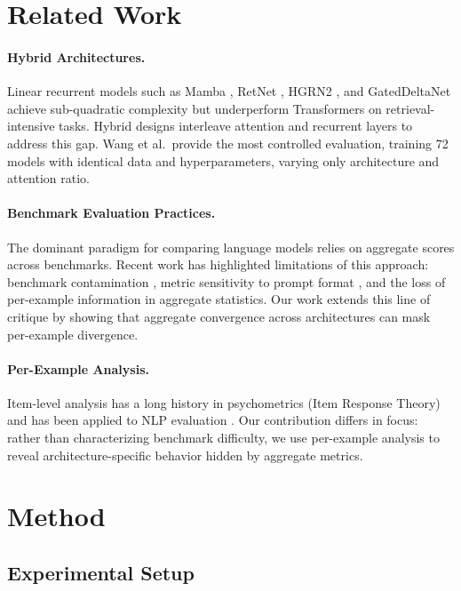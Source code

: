 \documentclass[11pt,a4paper]{article}
\begin{document}
\section{Related Work}
\label{sec:related}

\paragraph{Hybrid Architectures.}
Linear recurrent models such as Mamba \cite{gu2024mamba}, RetNet \cite{sun2023retentive}, HGRN2 \cite{qin2024hgrn2}, and GatedDeltaNet \cite{yang2024gated} achieve sub-quadratic complexity but underperform Transformers on retrieval-intensive tasks.
Hybrid designs interleave attention and recurrent layers to address this gap.
Wang et al.\ provide the most controlled evaluation, training 72 models with identical data and hyperparameters, varying only architecture and attention ratio.

\paragraph{Benchmark Evaluation Practices.}
The dominant paradigm for comparing language models relies on aggregate scores across benchmarks.
Recent work has highlighted limitations of this approach: benchmark contamination \cite{jacovi2023stop}, metric sensitivity to prompt format \cite{liang2023holistic}, and the loss of per-example information in aggregate statistics.
Our work extends this line of critique by showing that aggregate convergence across architectures can mask per-example divergence.

\paragraph{Per-Example Analysis.}
Item-level analysis has a long history in psychometrics (Item Response Theory) and has been applied to NLP evaluation \cite{lalor2019learning,rodriguez2021evaluation}.
Our contribution differs in focus: rather than characterizing benchmark difficulty, we use per-example analysis to reveal architecture-specific behavior hidden by aggregate metrics.

\section{Method}
\label{sec:method}

\subsection{Experimental Setup}
\end{document}
